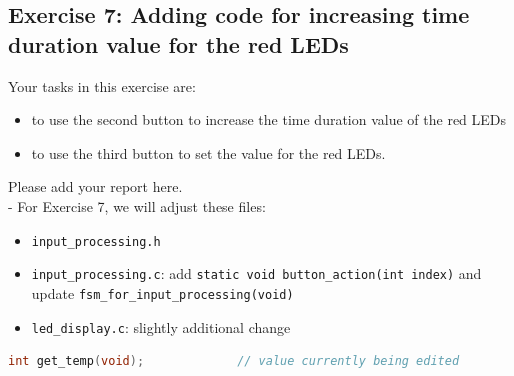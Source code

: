 \subsection{Exercise 7: Adding code for increasing time duration value for the red LEDs}
Your tasks in this exercise are: 
\begin{itemize}
    \item to use the second button to increase the time duration value of  the red LEDs
    \item to use the third button to set the value for the red LEDs.
\end{itemize}
Please add your report here.\\


- For Exercise 7, we will adjust these files:
\begin{itemize}
    \item \texttt{input\_processing.h}
    \item \texttt{input\_processing.c}: add \texttt{static void button\_action(int index)} and update \texttt{fsm\_for\_input\_processing(void)}
    \item \texttt{led\_display.c}: slightly additional change
\end{itemize}


\vspace{1em}
\begin{lstlisting}[language=c,caption={input\_processing.h}]
int get_temp(void);				// value currently being edited
\end{lstlisting}




